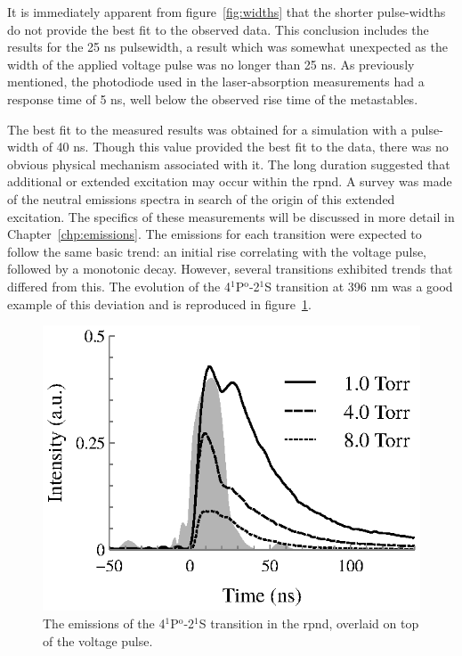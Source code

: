 It is immediately apparent from figure~\ref{fig:widths} that the shorter
pulse-widths do not provide the best fit to the observed data. This conclusion
includes the results for the 25 ns pulsewidth, a result which was somewhat
unexpected as the width of the applied voltage pulse was no longer than 25 ns.
As previously mentioned, the photodiode used in the laser-absorption
measurements had a response time of 5 ns, well below the observed rise time of
the metastables.

The best fit to the measured results was obtained for a simulation with a
pulse-width of 40 ns. Though this value provided the best fit to the data, there
was no obvious physical mechanism associated with it. The long duration
suggested that additional or extended excitation may occur within the
\acs{rpnd}. A survey was made of the neutral emissions spectra in search of the
origin of this extended excitation. The specifics of these measurements will be
discussed in more detail in Chapter~\ref{chp:emissions}. The emissions for each
transition were expected to follow the same basic trend: an initial rise
correlating with the voltage pulse, followed by a monotonic decay. However,
several transitions exhibited trends that differed from this. The evolution of
the 4$^1$P$^\mathrm{o}$-2$^1$S transition at 396 nm was a good example of this
deviation and is reproduced in figure~\ref{fig:double}.
\begin{figure}
  \centering
  \includegraphics{./chapters/modeling/figures/double.eps}
  \caption{The emissions of the 4$^1$P$^\mathrm{o}$-2$^1$S transition in the
  \acs{rpnd}, overlaid on top of the voltage pulse.}
  \label{fig:double}
\end{figure}
